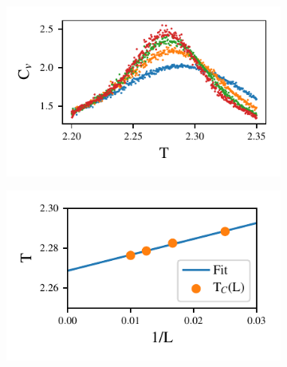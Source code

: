 \begin{figure}[ht]
  \begin{subfigure}[t]{.5\textwidth} %
    \centering
    \includegraphics[width=\linewidth]{../figures/fit.pdf}
    \caption{}
    \label{fig:sub-first}
  \end{subfigure}
  \hfill
  \begin{subfigure}[t]{.5\textwidth}
    \centering
    \includegraphics[width=\linewidth]{../figures/Tc_fit.pdf}
    \caption{}
    \label{fig:sub-second}
  \end{subfigure}
  \label{fig:test}
\end{figure}

